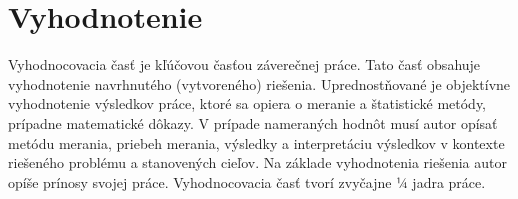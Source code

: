 
\chapter{Vyhodnotenie}\label{ch:evaluation}

Vyhodnocovacia časť je kľúčovou časťou záverečnej práce. Tato časť obsahuje vyhodnotenie navrhnutého (vytvoreného) riešenia. Uprednostňované je objektívne vyhodnotenie výsledkov práce, ktoré sa opiera o meranie a štatistické metódy, prípadne matematické dôkazy. V prípade nameraných hodnôt musí autor opísať metódu merania, priebeh merania, výsledky a interpretáciu výsledkov v kontexte riešeného problému a stanovených cieľov. Na základe vyhodnotenia riešenia autor opíše prínosy svojej práce. Vyhodnocovacia časť tvorí zvyčajne ¼ jadra práce.
